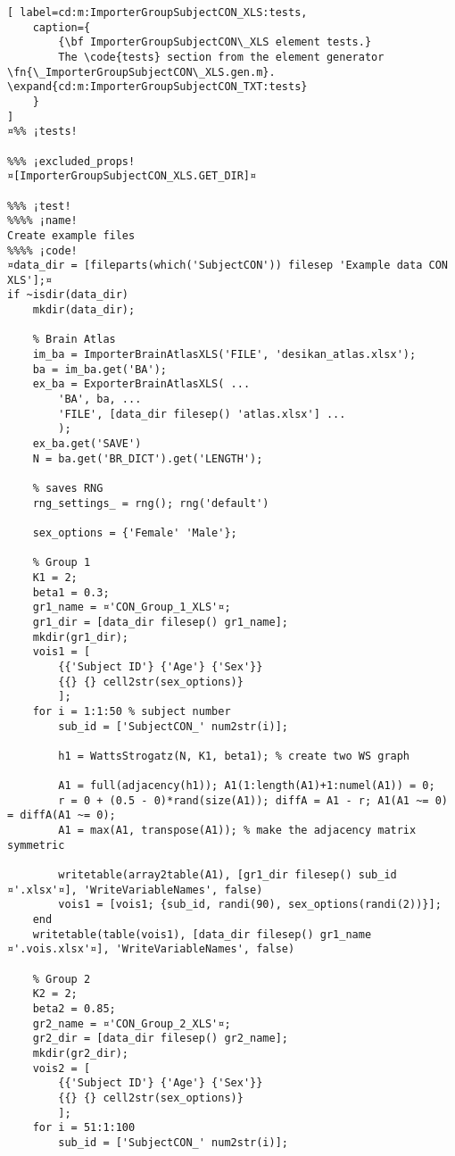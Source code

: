 \documentclass{tufte-handout}
\begin{document}
\clearpage
\begin{lstlisting}[	label=cd:m:ImporterGroupSubjectCON_XLS:tests,
	caption={
		{\bf ImporterGroupSubjectCON\_XLS element tests.}
		The \code{tests} section from the element generator \fn{\_ImporterGroupSubjectCON\_XLS.gen.m}. \expand{cd:m:ImporterGroupSubjectCON_TXT:tests}
	}
]
¤%% ¡tests!

%%% ¡excluded_props!
¤[ImporterGroupSubjectCON_XLS.GET_DIR]¤

%%% ¡test!
%%%% ¡name!
Create example files
%%%% ¡code!
¤data_dir = [fileparts(which('SubjectCON')) filesep 'Example data CON XLS'];¤
if ~isdir(data_dir)
    mkdir(data_dir);

    % Brain Atlas
    im_ba = ImporterBrainAtlasXLS('FILE', 'desikan_atlas.xlsx');
    ba = im_ba.get('BA');
    ex_ba = ExporterBrainAtlasXLS( ...
        'BA', ba, ...
        'FILE', [data_dir filesep() 'atlas.xlsx'] ...
        );
    ex_ba.get('SAVE')
    N = ba.get('BR_DICT').get('LENGTH');

    % saves RNG
    rng_settings_ = rng(); rng('default')

    sex_options = {'Female' 'Male'};

    % Group 1
    K1 = 2; 
    beta1 = 0.3; 
    gr1_name = ¤'CON_Group_1_XLS'¤;
    gr1_dir = [data_dir filesep() gr1_name];
    mkdir(gr1_dir);
    vois1 = [
        {{'Subject ID'} {'Age'} {'Sex'}}
        {{} {} cell2str(sex_options)}
        ];
    for i = 1:1:50 % subject number
        sub_id = ['SubjectCON_' num2str(i)];

        h1 = WattsStrogatz(N, K1, beta1); % create two WS graph

        A1 = full(adjacency(h1)); A1(1:length(A1)+1:numel(A1)) = 0; 
        r = 0 + (0.5 - 0)*rand(size(A1)); diffA = A1 - r; A1(A1 ~= 0) = diffA(A1 ~= 0); 
        A1 = max(A1, transpose(A1)); % make the adjacency matrix symmetric

        writetable(array2table(A1), [gr1_dir filesep() sub_id ¤'.xlsx'¤], 'WriteVariableNames', false)
        vois1 = [vois1; {sub_id, randi(90), sex_options(randi(2))}];
    end
    writetable(table(vois1), [data_dir filesep() gr1_name ¤'.vois.xlsx'¤], 'WriteVariableNames', false)

    % Group 2
    K2 = 2; 
    beta2 = 0.85; 
    gr2_name = ¤'CON_Group_2_XLS'¤;
    gr2_dir = [data_dir filesep() gr2_name];
    mkdir(gr2_dir);
    vois2 = [
        {{'Subject ID'} {'Age'} {'Sex'}}
        {{} {} cell2str(sex_options)}
        ];
    for i = 51:1:100
        sub_id = ['SubjectCON_' num2str(i)];


\end{lstlisting}
\end{document}
